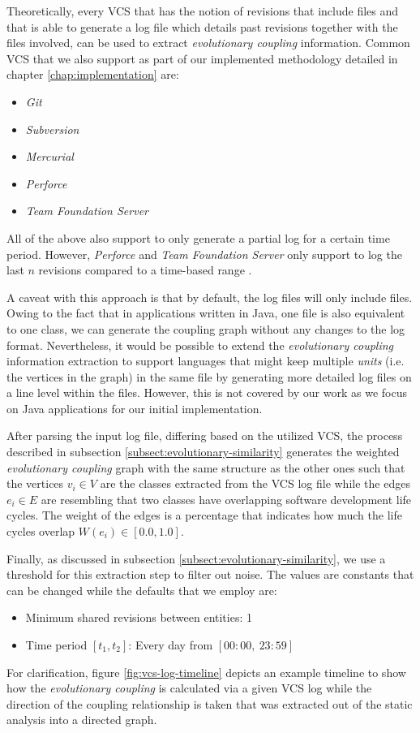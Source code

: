 \documentclass[12pt,a4paper]{report}
\begin{document}
Theoretically, every VCS that has the notion of revisions that include files
and that is able to generate a log file which details past revisions together
with the files involved, can be used to extract \textit{evolutionary coupling}
information. Common VCS that we also support as part of our implemented
methodology detailed in chapter \ref{chap:implementation} are:
\begin{itemize}[noitemsep]
  \item \textit{Git}
  \item \textit{Subversion}
  \item \textit{Mercurial}
  \item \textit{Perforce}
  \item \textit{Team Foundation Server}
\end{itemize}
All of the above also support to only generate a partial log for a certain
time period. However, \textit{Perforce} and \textit{Team Foundation Server}
only support to log the last \(n\) revisions compared to a time\hyp based range
\cite{perforce, team-foundation-server}.

A caveat with this approach is that by default, the log files will only
include files. Owing to the fact that in applications written in Java,
one file is also equivalent to one class, we can generate the coupling graph
without any changes to the log format. Nevertheless, it would be possible
to extend the \textit{evolutionary coupling} information extraction to support
languages that might keep multiple \textit{units} (i.e. the vertices in the graph)
in the same file by generating more detailed log files on a line level within
the files. However, this is not covered by our work as we focus on
Java applications for our initial implementation.

After parsing the input log file, differing based on the utilized VCS,
the process described in subsection \ref{subsect:evolutionary-similarity}
generates the weighted \textit{evolutionary coupling} graph with the same
structure as the other ones such that the vertices \(v_i \in V\) are the classes
extracted from the VCS log file while the edges \(e_i \in E\) are resembling
that two classes have overlapping software development life cycles.
The weight of the edges is a percentage that indicates how much the
life cycles overlap \(W(e_i) \in [0.0, 1.0]\).

Finally, as discussed in subsection \ref{subsect:evolutionary-similarity},
we use a threshold for this extraction step to filter out noise.
The values are constants that can be changed while the defaults that we employ are:
\begin{itemize}[noitemsep]
  \item Minimum shared revisions between entities: 1
  \item Time period \([t_1, t_2]\): Every day from \([00:00, \ 23:59]\)
\end{itemize}
For clarification, figure \ref{fig:vcs-log-timeline} depicts an example
timeline to show how the \textit{evolutionary coupling} is calculated
via a given VCS log while the direction of the coupling relationship is taken
that was extracted out of the static analysis into a directed graph.
\end{document}
